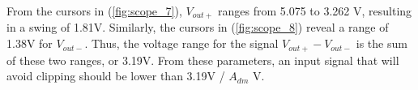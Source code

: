 \FloatBarrier

From the cursors in (\ref{fig:scope_7}), $V_{out+}$ ranges from 5.075 to 3.262 \si{\volt}, resulting in a swing of 1.81\si{\volt}.
Similarly, the cursors in (\ref{fig:scope_8}) reveal a range of 1.38\si{\volt} for $V_{out-}$.
Thus, the voltage range for the signal $V_{out+} - V_{out-}$ is the sum of these two ranges, or 3.19\si{\volt}.
From these parameters, an input signal that will avoid clipping should be lower than 3.19\si{\volt} / $A_{dm}$  \si{\volt}.